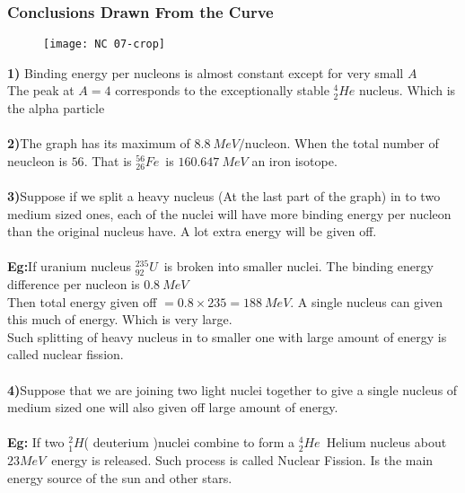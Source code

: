 \subsubsection{Conclusions Drawn From the Curve}
\begin{figure}[H]
	\centering
	\texttt{[image: NC 07-crop]}
	\caption{}
	\label{}
\end{figure}
\textbf{1)} \quad Binding energy per nucleons is almost constant except for very small $A$\\
The peak at $A=4$ corresponds to the exceptionally stable $^4_2He$ nucleus. Which is the alpha particle \\\\
\textbf{2)}\quad The graph has its maximum of $8.8\ MeV/\text{nucleon}$. When the total number of neucleon is $56$. That is $^{56}_{26}Fe$\ is $160.647\ MeV$ an iron isotope.\\\\
\textbf{3)}Suppose if we split a heavy nucleus (At the last part of the graph) in to two medium sized ones, each of the nuclei will have more binding energy per nucleon than the original nucleus have. A lot extra energy will be given off.\\\\
\textbf{Eg:}\quad If uranium nucleus $^{235}_{92}U$\ is broken into smaller nuclei. The binding energy difference per nucleon is $0.8\ MeV$\\
Then total energy given off $=0.8\times235=188\ MeV$. A single nucleus can given this much of energy. Which is very large.\\
Such splitting of heavy nucleus in to smaller one with large amount of energy is called nuclear fission.\\\\
\textbf{4)}\quad Suppose that we are joining two light nuclei together to give a single nucleus of medium sized one will also given off large amount of energy.\\\\
\textbf{Eg:} \quad If two $^2_1H$( deuterium )nuclei combine to form a  $^4_2He$\ Helium nucleus about $23MeV$\ energy is released. Such process is called Nuclear Fission. Is the main energy source of the sun and other stars.
